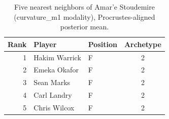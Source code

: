 \begin{table}[htbp]
  \centering\small
  \begin{tabular}{rllc}
    \toprule
    Rank & Player & Position & Archetype \\
    \midrule
    1 & Hakim Warrick & F & 2 \\
    2 & Emeka Okafor & F & 2 \\
    3 & Sean Marks & F & 2 \\
    4 & Carl Landry & F & 2 \\
    5 & Chris Wilcox & F & 2 \\
    \bottomrule
  \end{tabular}
  \caption{Five nearest neighbors of Amar'e Stoudemire (curvature_m1 modality), Procrustes-aligned posterior mean.}
  \label{tab:Amar_e_Stoudemire_neighbors_curvature_m1}
\end{table}


